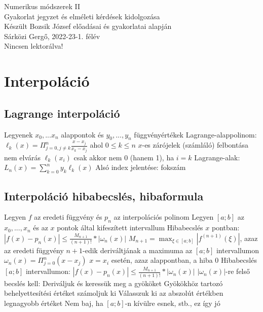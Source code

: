\documentclass[12pt,a4paper]{article}
\begin{document}
\begin{center}
	\huge
	Numerikus módszerek II\\
	\vspace{1mm}
	\LARGE
	Gyakorlat jegyzet és elméleti kérdések kidolgozása\\
	\vspace{5mm}
	\large
	Készült Bozsik József előadásai és gyakorlatai alapján\\
	\vspace{5mm}
	Sárközi Gergő, 2022-23-1. félév\\
	Nincsen lektorálva!
\end{center}

\tableofcontents

\pagebreak

\section{Interpoláció}

\subsection{Lagrange interpoláció}

\begin{outline}
	\1 Legyenek $x_0,...x_n$ alappontok és $y_0,...,y_n$ függvényértékek
	\1 Lagrange-alappolinom: $\ell_k(x) = \Pi_{j=0,j \ne k}^n \frac{x-x_j}{x_k-x_j}$ ahol $0 \le k \le n$
		\2 $x$-es zárójelek (számláló) felbontása nem elvárás
		\2 $\ell_k(x_i)$ csak akkor nem 0 (hanem 1), ha $i=k$
	\1 Lagrange-alak: $L_n(x) = \sum_{k=0}^n y_k \ell_k(x)$
		\2 Alsó index jelentése: fokszám
\end{outline}

\subsection{Interpoláció hibabecslés, hibaformula}

\begin{outline}
	\1 Legyen $f$ az eredeti függvény és $p_n$ az interpolációs polinom
	\1 Legyen $[a;b]$ az $x_0,...,x_n$ és az $x$ pontok által kifeszített intervallum
	\1 Hibabecslés $x$ pontban: $|f(x)-p_n(x)| \le \frac{M_{n+1}}{(n+1)!}*|\omega_n(x)|$
		\2 $M_{n+1} = \max_{\xi \in [a;b]} |f^{(n+1)}(\xi)|$, azaz az eredeti függvény $n+1$-edik deriváltjának a maximuma az $[a;b]$ intervallumon
		\2 $\omega_n(x) = \Pi_{j=0}^n (x-x_j)$
		\2 $x=x_i$ esetén, azaz alappontban, a hiba 0
	\1 Hibabecslés $[a;b]$ intervallumon: $|f(x)-p_n(x)| \le \frac{M_{n+1}}{(n+1)!}*|\omega_n(x)|$
		\2 $|\omega_n(x)|$-re felső becslés kell:
			\3 Deriváljuk és keressük meg a gyököket
			\3 Gyökökhöz tartozó behelyettesítési értéket számoljuk ki
			\3 Válasszuk ki az abszolút értékben legnagyobb értéket
			\3 Nem baj, ha $[a;b]$-n kívülre esnek, stb., ez így jó
\end{outline}
\end{document}

